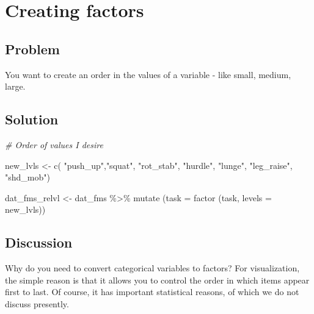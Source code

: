 \documentclass[
]{book}
\newenvironment{Shaded}{\begin{snugshade}}{\end{snugshade}}
\newcommand{\AttributeTok}[1]{\textcolor[rgb]{0.77,0.63,0.00}{#1}}
\newcommand{\CommentTok}[1]{\textcolor[rgb]{0.56,0.35,0.01}{\textit{#1}}}
\newcommand{\FunctionTok}[1]{\textcolor[rgb]{0.00,0.00,0.00}{#1}}
\newcommand{\NormalTok}[1]{#1}
\newcommand{\OtherTok}[1]{\textcolor[rgb]{0.56,0.35,0.01}{#1}}
\newcommand{\SpecialCharTok}[1]{\textcolor[rgb]{0.00,0.00,0.00}{#1}}
\newcommand{\StringTok}[1]{\textcolor[rgb]{0.31,0.60,0.02}{#1}}
\begin{document}
\hypertarget{WRANGLE-CHARACTERS-2-FACTORS}{%
\section{Creating factors}\label{WRANGLE-CHARACTERS-2-FACTORS}}

\hypertarget{problem-8}{%
\subsection{Problem}\label{problem-8}}

You want to create an order in the values of a variable - like small, medium, large.

\hypertarget{solution-8}{%
\subsection{Solution}\label{solution-8}}

\begin{Shaded}
\begin{Highlighting}[]
\CommentTok{\# Order of values I desire}

\NormalTok{new\_lvls }\OtherTok{\textless{}{-}} \FunctionTok{c}\NormalTok{( }\StringTok{"push\_up"}\NormalTok{,}\StringTok{"squat"}\NormalTok{, }\StringTok{"rot\_stab"}\NormalTok{, }\StringTok{"hurdle"}\NormalTok{, }\StringTok{"lunge"}\NormalTok{, }\StringTok{"leg\_raise"}\NormalTok{,  }\StringTok{"shd\_mob"}\NormalTok{)}

\NormalTok{dat\_fms\_relvl }\OtherTok{\textless{}{-}}\NormalTok{ dat\_fms }\SpecialCharTok{\%\textgreater{}\%}
  \FunctionTok{mutate}\NormalTok{ (}\AttributeTok{task =} \FunctionTok{factor}\NormalTok{ (task, }\AttributeTok{levels =}\NormalTok{ new\_lvls))}
\end{Highlighting}
\end{Shaded}

\hypertarget{discussion-2}{%
\subsection{Discussion}\label{discussion-2}}

Why do you need to convert categorical variables to factors? For visualization, the simple reason is that it allows you to control the order in which items appear first to last. Of course, it has important statistical reasons, of which we do not discuss presently.
\end{document}
